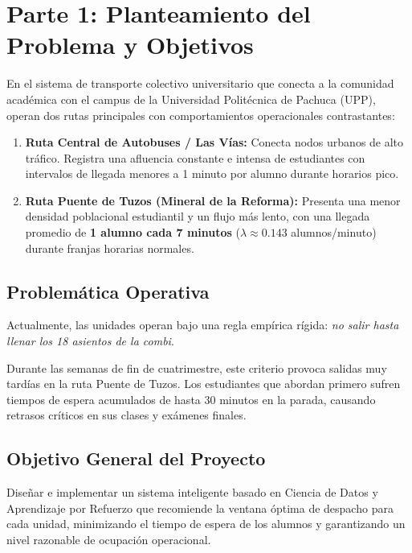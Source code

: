 \section{Parte 1: Planteamiento del Problema y Objetivos}

En el sistema de transporte colectivo universitario que conecta a la comunidad académica con el campus de la Universidad Politécnica de Pachuca (UPP), operan dos rutas principales con comportamientos operacionales contrastantes:

\begin{enumerate}
	\item \textbf{Ruta Central de Autobuses / Las Vías:} Conecta nodos urbanos de alto tráfico. Registra una afluencia constante e intensa de estudiantes con intervalos de llegada menores a 1 minuto por alumno durante horarios pico.
	\item \textbf{Ruta Puente de Tuzos (Mineral de la Reforma):} Presenta una menor densidad poblacional estudiantil y un flujo más lento, con una llegada promedio de \textbf{1 alumno cada 7 minutos} ($\lambda \approx 0.143$ alumnos/minuto) durante franjas horarias normales.
\end{enumerate}

\subsection{Problemática Operativa}

Actualmente, las unidades operan bajo una regla empírica rígida: \textit{no salir hasta llenar los 18 asientos de la combi}. 

Durante las semanas de fin de cuatrimestre, este criterio provoca salidas muy tardías en la ruta Puente de Tuzos. Los estudiantes que abordan primero sufren tiempos de espera acumulados de hasta 30 minutos en la parada, causando retrasos críticos en sus clases y exámenes finales.

\subsection{Objetivo General del Proyecto}

Diseñar e implementar un sistema inteligente basado en Ciencia de Datos y Aprendizaje por Refuerzo que recomiende la ventana óptima de despacho para cada unidad, minimizando el tiempo de espera de los alumnos y garantizando un nivel razonable de ocupación operacional.

